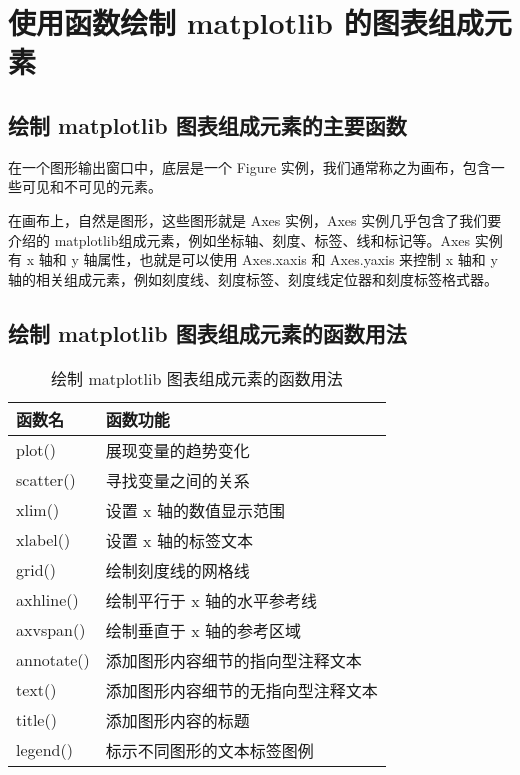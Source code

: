 \chapter{使用函数绘制 matplotlib 的图表组成元素\label{ch01}}
\section{绘制 matplotlib 图表组成元素的主要函数}
在一个图形输出窗口中，底层是一个 Figure 实例，我们通常称之为画布，包含一些可见和不可见的元素。

在画布上，自然是图形，这些图形就是 Axes 实例，Axes 实例几乎包含了我们要介绍的 matplotlib组成元素，例如坐标轴、刻度、标签、线和标记等。Axes 实例有 x 轴和 y 轴属性，也就是可以使用 Axes.xaxis 和 Axes.yaxis 来控制 x 轴和 y 轴的相关组成元素，例如刻度线、刻度标签、刻度线定位器和刻度标签格式器。
\section{绘制 matplotlib 图表组成元素的函数用法}
\begin{table}
    \centering
    \caption{绘制 matplotlib 图表组成元素的函数用法}
    \label{tbl1-1}
    \begin{tabular}{ll}
        \hline
        函数名        & 函数功能              \\
        \hline
        plot()     & 展现变量的趋势变化         \\
        scatter()  & 寻找变量之间的关系         \\
        xlim()     & 设置 x 轴的数值显示范围     \\
        xlabel()   & 设置 x 轴的标签文本       \\
        grid()     & 绘制刻度线的网格线         \\
        axhline()  & 绘制平行于 x 轴的水平参考线   \\
        axvspan()  & 绘制垂直于 x 轴的参考区域    \\
        annotate() & 添加图形内容细节的指向型注释文本  \\
        text()     & 添加图形内容细节的无指向型注释文本 \\
        title()    & 添加图形内容的标题         \\
        legend()   & 标示不同图形的文本标签图例     \\
        \hline
    \end{tabular}
\end{table}